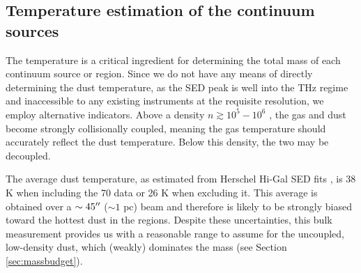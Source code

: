 \documentclass[twocolumn]{aastex61}
\begin{document}
% 
% 
% 


\subsection{Temperature estimation of the continuum sources}
\label{sec:temperature}
The temperature is a critical ingredient for determining the total mass of each
continuum source or region. Since we do not have any means of directly
determining the dust temperature, as the SED peak is well into the THz regime
and inaccessible to any existing instruments at the requisite resolution, we
employ alternative indicators.  Above a density $n\gtrsim10^5-10^6$ \percc,
the gas and dust become strongly collisionally coupled, meaning the gas
temperature should accurately reflect the dust temperature.  Below this density,
the two may be decoupled.

The average dust temperature, as estimated from Herschel Hi-Gal SED fits
\citep{Molinari2016a,Wang2015a}, is 38 K when including the 70 \um data or 26 K
when excluding it.  This average is obtained over a $\sim45\mbox{$^{\prime\prime}$}$ ($\sim 1$
pc) beam and therefore is likely to be strongly biased toward the hottest dust
in the \hii regions.  Despite these
uncertainties, this bulk measurement provides us with a reasonable range to
assume for the uncoupled, low-density dust, which (weakly) dominates the mass
(see Section \ref{sec:massbudget}).
\end{document}
